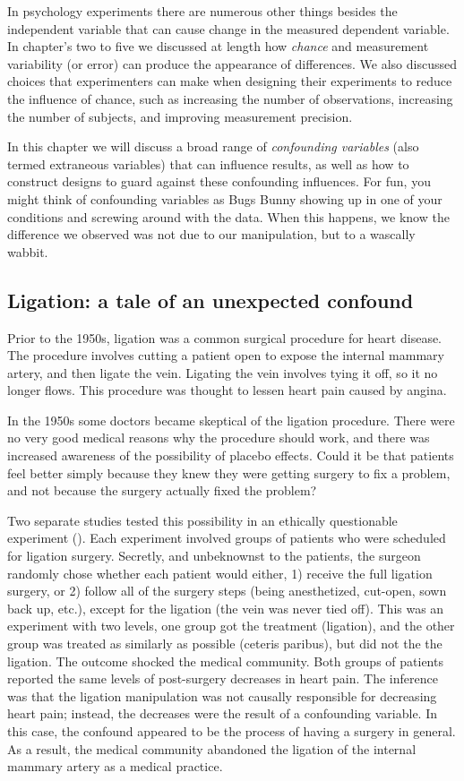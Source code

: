 In psychology experiments there are numerous other things besides the independent variable that can cause change in the measured dependent variable. In chapter's two to five we discussed at length how \emph{chance} and measurement variability (or error) can produce the appearance of differences. We also discussed choices that experimenters can make when designing their experiments to reduce the influence of chance, such as increasing the number of observations, increasing the number of subjects, and improving measurement precision.

In this chapter we will discuss a broad range of \emph{confounding variables} (also termed extraneous variables) that can influence results, as well as how to construct designs to guard against these confounding influences. For fun, you might think of confounding variables as Bugs Bunny showing up in one of your conditions and screwing around with the data. When this happens, we know the difference we observed was not due to our manipulation, but to a wascally wabbit.

\subsection{Ligation: a tale of an unexpected confound}

Prior to the 1950s, ligation was a common surgical procedure for heart disease. The procedure involves cutting a patient open to expose the internal mammary artery, and then ligate the vein. Ligating the vein involves tying it off, so it no longer flows. This procedure was thought to lessen heart pain caused by angina.

In the 1950s some doctors became skeptical of the ligation procedure. There were no very good medical reasons why the procedure should work, and there was increased awareness of the possibility of placebo effects. Could it be that patients feel better simply because they knew they were getting surgery to fix a problem, and not because the surgery actually fixed the problem?

Two separate studies tested this possibility in an ethically questionable experiment (). Each experiment involved groups of patients who were scheduled for ligation surgery. Secretly, and unbeknownst to the patients, the surgeon randomly chose whether each patient would either, 1) receive the full ligation surgery, or 2) follow all of the surgery steps (being anesthetized, cut-open, sown back up, etc.), except for the ligation (the vein was never tied off). This was an experiment with two levels, one group got the treatment (ligation), and the other group was treated as similarly as possible (ceteris paribus), but did not the the ligation. The outcome shocked the medical community. Both groups of patients reported the same levels of post-surgery decreases in heart pain. The inference was that the ligation manipulation was not causally responsible for decreasing heart pain; instead, the decreases were the result of a confounding variable. In this case, the confound appeared to be the process of having a surgery in general. As a result, the medical community abandoned the ligation of the internal mammary artery as a medical practice. 

